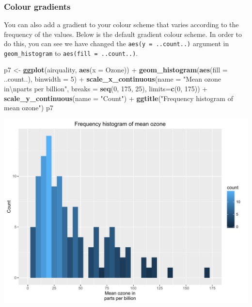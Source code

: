 \documentclass[]{article}
\newenvironment{Shaded}{\begin{snugshade}}{\end{snugshade}}
\newcommand{\KeywordTok}[1]{\textcolor[rgb]{0.13,0.29,0.53}{\textbf{{#1}}}}
\newcommand{\DataTypeTok}[1]{\textcolor[rgb]{0.13,0.29,0.53}{{#1}}}
\newcommand{\DecValTok}[1]{\textcolor[rgb]{0.00,0.00,0.81}{{#1}}}
\newcommand{\CharTok}[1]{\textcolor[rgb]{0.31,0.60,0.02}{{#1}}}
\newcommand{\StringTok}[1]{\textcolor[rgb]{0.31,0.60,0.02}{{#1}}}
\newcommand{\NormalTok}[1]{{#1}}
\begin{document}
\subsubsection{Colour gradients}\label{colour-gradients}

You can also add a gradient to your colour scheme that varies according
to the frequency of the values. Below is the default gradient colour
scheme. In order to do this, you can see we have changed the
\texttt{aes(y\ =\ ..count..)} argument in \texttt{geom\_histogram} to
\texttt{aes(fill\ =\ ..count..)}.

\begin{Shaded}
\begin{Highlighting}[]
\NormalTok{p7 <-}\StringTok{ }\KeywordTok{ggplot}\NormalTok{(airquality, }\KeywordTok{aes}\NormalTok{(}\DataTypeTok{x =} \NormalTok{Ozone)) +}\StringTok{ }
\StringTok{      }\KeywordTok{geom_histogram}\NormalTok{(}\KeywordTok{aes}\NormalTok{(}\DataTypeTok{fill =} \NormalTok{..count..), }\DataTypeTok{binwidth =} \DecValTok{5}\NormalTok{) +}
\StringTok{      }\KeywordTok{scale_x_continuous}\NormalTok{(}\DataTypeTok{name =} \StringTok{"Mean ozone in}\CharTok{\textbackslash{}n}\StringTok{parts per billion"}\NormalTok{,}
                         \DataTypeTok{breaks =} \KeywordTok{seq}\NormalTok{(}\DecValTok{0}\NormalTok{, }\DecValTok{175}\NormalTok{, }\DecValTok{25}\NormalTok{),}
                         \DataTypeTok{limits=}\KeywordTok{c}\NormalTok{(}\DecValTok{0}\NormalTok{, }\DecValTok{175}\NormalTok{)) +}
\StringTok{      }\KeywordTok{scale_y_continuous}\NormalTok{(}\DataTypeTok{name =} \StringTok{"Count"}\NormalTok{) +}
\StringTok{      }\KeywordTok{ggtitle}\NormalTok{(}\StringTok{"Frequency histogram of mean ozone"}\NormalTok{)}
\NormalTok{p7}
\end{Highlighting}
\end{Shaded}

\begin{center}\includegraphics{0_all_posts_pdf/histogram_11-1} \end{center}
\end{document}
